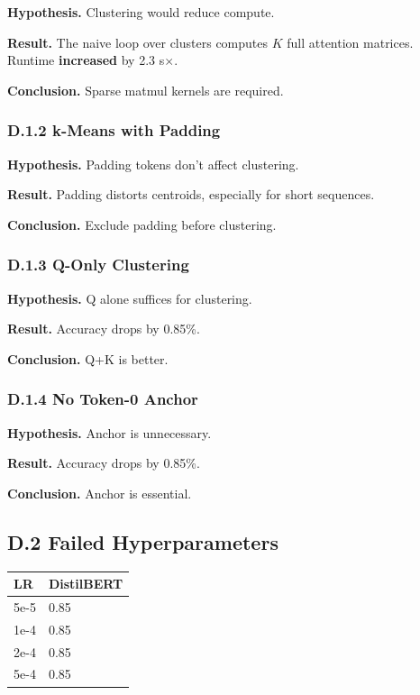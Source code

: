 \textbf{Hypothesis.} Clustering would reduce compute.

\textbf{Result.} The naive loop over clusters computes $K$ full attention 
matrices. Runtime \textbf{increased} by 2.3 s$\times$.

\textbf{Conclusion.} Sparse matmul kernels are required.

\subsubsection{D.1.2 k-Means with Padding}

\textbf{Hypothesis.} Padding tokens don't affect clustering.

\textbf{Result.} Padding distorts centroids, especially for short sequences.

\textbf{Conclusion.} Exclude padding before clustering.

\subsubsection{D.1.3 Q-Only Clustering}

\textbf{Hypothesis.} Q alone suffices for clustering.

\textbf{Result.} Accuracy drops by 0.85\%.

\textbf{Conclusion.} Q+K is better.

\subsubsection{D.1.4 No Token-0 Anchor}

\textbf{Hypothesis.} Anchor is unnecessary.

\textbf{Result.} Accuracy drops by 0.85\%.

\textbf{Conclusion.} Anchor is essential.

\subsection{D.2 Failed Hyperparameters}

\begin{table}[H]
\centering
\small
\begin{tabular}{ll}
\toprule
\textbf{LR} & \textbf{DistilBERT} \\
\midrule
5e-5 & 0.85 \\
1e-4 & 0.85 \\
2e-4 & 0.85 \\
5e-4 & 0.85 \\
\bottomrule
\end{tabular}
\end{table}

